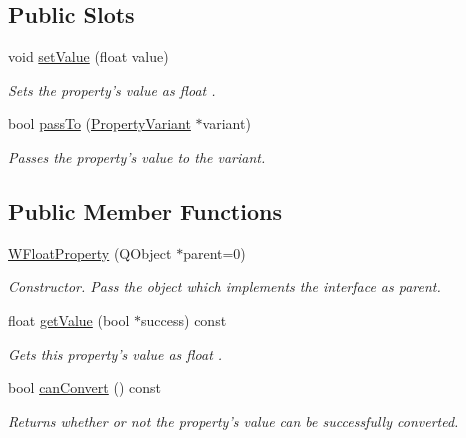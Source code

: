 \subsection*{Public Slots}
\begin{DoxyCompactItemize}
\item 
void \hyperlink{class_w_float_property_addd5ab4fe5a6b75f12e604c994c4d096}{set\-Value} (float value)
\begin{DoxyCompactList}\small\item\em Sets the property's value as float . \end{DoxyCompactList}\item 
bool \hyperlink{class_w_float_property_a6da253f88b37ee72187107956200a2ba}{pass\-To} (\hyperlink{class_property_variant}{Property\-Variant} $\ast$variant)
\begin{DoxyCompactList}\small\item\em Passes the property's value to the variant. \end{DoxyCompactList}\end{DoxyCompactItemize}
\subsection*{Public Member Functions}
\begin{DoxyCompactItemize}
\item 
\hyperlink{class_w_float_property_a0feb213835bd18827d230c8de6c8b788}{W\-Float\-Property} (Q\-Object $\ast$parent=0)
\begin{DoxyCompactList}\small\item\em Constructor. Pass the object which implements the interface as parent. \end{DoxyCompactList}\item 
float \hyperlink{class_w_float_property_acdfaccfb44bff32042d5eecb377f406d}{get\-Value} (bool $\ast$success) const 
\begin{DoxyCompactList}\small\item\em Gets this property's value as float . \end{DoxyCompactList}\item 
bool \hyperlink{class_w_float_property_a7eee2964a782c7909b11f7621504fc11}{can\-Convert} () const 
\begin{DoxyCompactList}\small\item\em Returns whether or not the property's value can be successfully converted. \end{DoxyCompactList}\end{DoxyCompactItemize}
